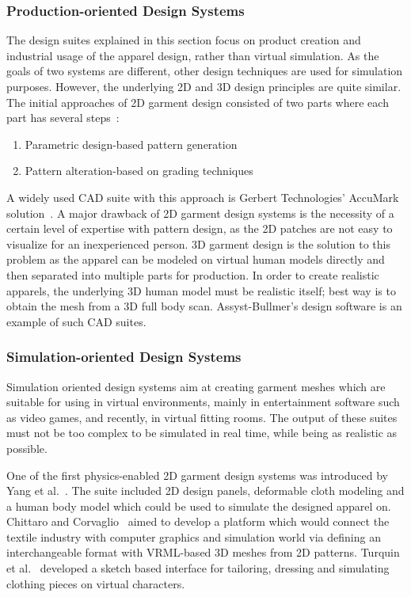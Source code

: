 \subsubsection{Production-oriented Design Systems}

The design suites explained in this section focus on product creation and industrial usage of the apparel design, rather than virtual simulation. As the goals of two systems are different, other design techniques are used for simulation purposes. However, the underlying 2D and 3D design principles are quite similar. The initial approaches of 2D garment design consisted of two parts where each part has several steps~\cite{Yang2007}:  
 
\begin{enumerate}
\item Parametric design-based pattern generation
\item Pattern alteration-based on grading techniques
\end{enumerate}    
 
A widely used CAD suite with this approach is Gerbert Technologies' AccuMark solution~\cite{Gerbert2013}. A major drawback of 2D garment design systems is the necessity of a certain level of expertise with pattern design, as the 2D patches are not easy to visualize for an inexperienced person. 3D garment design is the solution to this problem as the apparel can be modeled on virtual human models directly and then separated 
into multiple parts for production. In order to create realistic apparels, the underlying 3D human model must be realistic itself; best way is to obtain the mesh from a 3D full body scan. Assyst-Bullmer's design software is an example of such CAD suites\cite{Assyst2013}. 
 
\subsubsection{Simulation-oriented Design Systems} 
 
Simulation oriented design systems aim at creating garment meshes which are suitable for using in virtual environments, mainly in entertainment software such as video games, and recently, in virtual fitting rooms. The output of these suites must not be too complex to be simulated in real time, while being as realistic as possible.
 
One of the first physics-enabled 2D garment design systems was introduced by Yang et al.~\cite{Yang1992}. The suite included 2D design panels, deformable cloth modeling and a human body model which could be used to simulate the designed apparel on. Chittaro and Corvaglio~\cite{Chittaro2003} aimed to develop a platform which would connect the textile industry with computer graphics and simulation world via defining an interchangeable format with VRML-based 3D meshes from 2D patterns. Turquin et al.~\cite{Turquin2007} developed a sketch based interface for tailoring, dressing and simulating clothing pieces on virtual characters.
 
